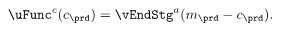   \begin{equation}\begin{gathered}\begin{aligned}
        \uFunc^{c}(c_{\prd})   & = \vEndStg^{a}(m_{\prd}-c_{\prd}).
        \label{eq:upEqbetaOp}
      \end{aligned}\end{gathered}\end{equation}
